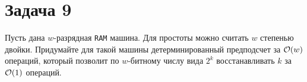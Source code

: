 \section{Задача 9}
Пусть дана $w$-разрядная \texttt{RAM} машина. Для простоты можно считать
$w$ степенью двойки. Придумайте для такой машины детерминированный предподсчет за $\mathcal{O}(w)$ операций, который позволит по $w$-битному числу вида $2^k$ восстанавливать $k$ за $\mathcal{O}(1)$ операций.
